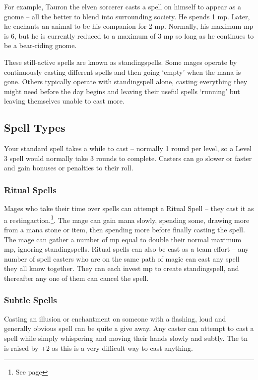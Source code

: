 \begin{multicols}{2}
For example, Tauron the elven sorcerer casts a spell on himself to appear as a gnome -- all the better to blend into surrounding society. He spends 1 \gls{mp}. Later, he enchants an animal to be his companion for 2 \gls{mp}. Normally, his maximum \gls{mp} is 6, but he is currently reduced to a maximum of 3 \gls{mp} so long as he continues to be a bear-riding gnome.

These still-active spells are known as \glspl{standingspell}. Some mages operate by continuously casting different spells and then going `empty' when the mana is gone. Others typically operate with \gls{standingspell} alone, casting everything they might need before the day begins and leaving their useful spells `running' but leaving themselves unable to cast more.

\subsection{Spell Types}

Your standard spell takes a while to cast -- normally 1 \gls{round} per level, so a Level 3 spell would normally take 3 \glspl{round} to complete.  Casters can go slower or faster and gain bonuses or penalties to their roll.

\subsubsection{Ritual Spells}

Mages who take their time over spells can attempt a Ritual Spell -- they cast it as a \gls{restingaction}.\footnote{See page \pageref{restingactions}}.
The mage can gain mana slowly, spending some, drawing more from a mana stone or item, then spending more before finally casting the spell.
The mage can gather a number of \gls{mp} equal to double their normal maximum \gls{mp}, ignoring \glspl{standingspell}.
Ritual spells can also be cast as a team effort -- any number of spell casters who are on the same \gls{path} of magic can cast any spell they all know together.
They can each invest \gls{mp} to create \gls{standingspell}, and thereafter any one of them can cancel the spell.

\subsubsection{Subtle Spells}

Casting an illusion or enchantment on someone with a flashing, loud and generally obvious spell can be quite a give away. Any caster can attempt to cast a spell while simply whispering and moving their hands slowly and subtly.  The \gls{tn} is raised by +2 as this is a very difficult way to cast anything.


\end{multicols}
